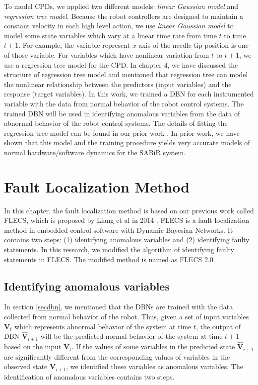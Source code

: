 To model CPDs, we applied two different models: {\it linear Gaussian model} and {\it regression tree model}. Because the robot controllers are designed to maintain a constant velocity in each high level action, we use {\it linear Gaussian model} to model some state variables which vary at a linear time rate from time $t$ to time $t+1$. For example, the variable represent $x$ axis of the needle tip position is one of those variable. For variables which have nonlinear variation from $t$ to $t+1$, we use a regression tree model for the CPD. In chapter 4, we have discussed the structure of regression tree model and mentioned that regression tree can model the nonlinear relationship between the predictors (input variables) and the response (target variables). In this work, we trained a DBN for each instrumented variable with the data from normal behavior of the robot control systems. The trained DBN will be used in identifying anomalous variables from the data of abnormal behavior of the robot control systems. The details of fitting the regression tree model can be found in our prior work \cite{cao2012classification}. In prior work, we have shown that this model and the training procedure yields very accurate models of normal hardware/software dynamics for the SABiR system. 

\section{Fault Localization Method}\label{dbnflalg}
In this chapter, the fault localization method is based on our previous work called FLECS, which is proposed by Liang et al in 2014 \cite{liang2015fault}. FLECS is a fault localization method in embedded control software with Dynamic Bayesian Networks. It contains two steps: (1) identifying anomalous variables and (2) identifying faulty statements. In this research, we modified the algorithm of identifying faulty statements in FLECS. The modified method is named as FLECS 2.0. 

\subsection{Identifying anomalous variables}
In section \ref{secdbn}, we mentioned that the DBNs are trained with the data collected from normal behavior of the robot. Thus, given a set of input variables ${\pmb{V}_t}$ which represents abnormal behavior of the system at time $t$, the output of DBN $ {\pmb{{\hat V}}_{i + 1}} $ will be the predicted normal behavior of the system at time $t+1$ based on the input ${\pmb{V}_t} $. If the values of some variables in the predicted state $ {\pmb{{\hat V}}_{i + 1}} $ are significantly different from the corresponding values of variables in the observed state  $ {\pmb{V}_{i + 1}} $, we identified these variables as anomalous variables. The identification of anomalous variables contains two steps.

